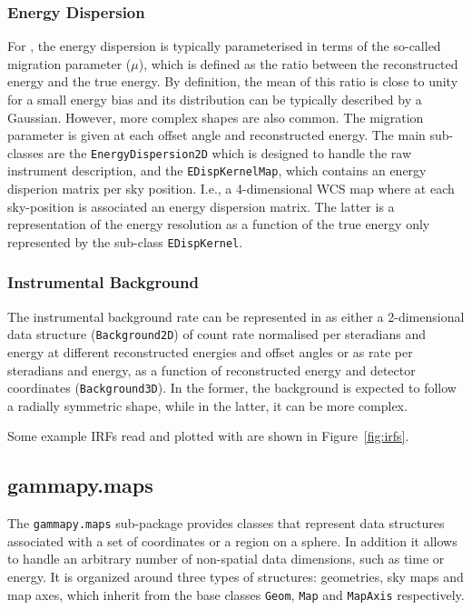\documentclass[traditabstract, longauth]{aa}
\newcommand{\code}[1]{\texttt{#1}}
\begin{document}
{\subsubsection{Energy Dispersion}
For \iacts, the energy dispersion is typically parameterised in terms of the so-called
migration parameter ($\mu$), which is defined as the ratio between the
reconstructed energy and the true energy. By definition, the mean of this ratio is
close to unity for a small energy bias and its distribution can 
be typically described by a Gaussian. However, more complex
shapes are also common. The migration parameter is given at each offset angle and
reconstructed energy. The main sub-classes are the \code{EnergyDispersion2D} which is
designed to handle the raw instrument description, and the \code{EDispKernelMap},
which contains an energy disperion matrix per sky position. I.e., a 4-dimensional WCS map
where at each sky-position is associated an energy dispersion matrix.
The latter is a representation of the energy resolution as a function of the
true energy only represented by the sub-class \code{EDispKernel}.

\subsubsection{Instrumental Background}
The instrumental background rate can be represented in \gammapy as either a 2-dimensional
data structure (\code{Background2D}) of count rate normalised per steradians and energy at different
reconstructed energies and offset angles or as rate per steradians and energy, as a
function of reconstructed energy and detector coordinates (\code{Background3D}).
In the former, the background is expected to follow a radially symmetric shape,
while in the latter, it can be more complex.

Some example IRFs read and plotted with \gammapy are shown in Figure~\ref{fig:irfs}.

\subsection{gammapy.maps}
\label{ssec:gammapy-maps}
The \code{gammapy.maps} sub-package provides classes that represent data
structures associated with a set of coordinates or a region on a sphere. In
addition it allows to handle an arbitrary number of non-spatial data
dimensions, such as time or energy. It is organized around three types of
structures: geometries, sky maps and map axes, which inherit from the base
classes \code{Geom}, \code{Map} and \code{MapAxis} respectively.

}
\end{document}
